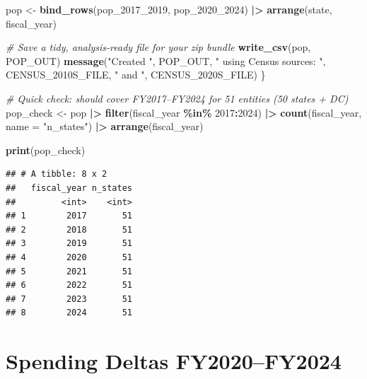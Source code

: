 \documentclass[
  11pt,
]{article}
\newenvironment{Shaded}{\begin{snugshade}}{\end{snugshade}}
\newcommand{\AttributeTok}[1]{\textcolor[rgb]{0.13,0.29,0.53}{#1}}
\newcommand{\CommentTok}[1]{\textcolor[rgb]{0.56,0.35,0.01}{\textit{#1}}}
\newcommand{\DecValTok}[1]{\textcolor[rgb]{0.00,0.00,0.81}{#1}}
\newcommand{\FunctionTok}[1]{\textcolor[rgb]{0.13,0.29,0.53}{\textbf{#1}}}
\newcommand{\NormalTok}[1]{#1}
\newcommand{\OtherTok}[1]{\textcolor[rgb]{0.56,0.35,0.01}{#1}}
\newcommand{\SpecialCharTok}[1]{\textcolor[rgb]{0.81,0.36,0.00}{\textbf{#1}}}
\newcommand{\StringTok}[1]{\textcolor[rgb]{0.31,0.60,0.02}{#1}}
\begin{document}
\begin{Shaded}
\begin{Highlighting}[]
\NormalTok{  pop }\OtherTok{\textless{}{-}} \FunctionTok{bind\_rows}\NormalTok{(pop\_2017\_2019, pop\_2020\_2024) }\SpecialCharTok{|\textgreater{}}
    \FunctionTok{arrange}\NormalTok{(state, fiscal\_year)}

  \CommentTok{\# Save a tidy, analysis{-}ready file for your zip bundle}
  \FunctionTok{write\_csv}\NormalTok{(pop, POP\_OUT)}
  \FunctionTok{message}\NormalTok{(}\StringTok{"Created "}\NormalTok{, POP\_OUT, }\StringTok{" using Census sources: "}\NormalTok{, CENSUS\_2010S\_FILE, }\StringTok{" and "}\NormalTok{, CENSUS\_2020S\_FILE)}
\NormalTok{\}}

\CommentTok{\# Quick check: should cover FY2017–FY2024 for 51 entities (50 states + DC)}
\NormalTok{pop\_check }\OtherTok{\textless{}{-}}\NormalTok{ pop }\SpecialCharTok{|\textgreater{}}
  \FunctionTok{filter}\NormalTok{(fiscal\_year }\SpecialCharTok{\%in\%} \DecValTok{2017}\SpecialCharTok{:}\DecValTok{2024}\NormalTok{) }\SpecialCharTok{|\textgreater{}}
  \FunctionTok{count}\NormalTok{(fiscal\_year, }\AttributeTok{name =} \StringTok{"n\_states"}\NormalTok{) }\SpecialCharTok{|\textgreater{}}
  \FunctionTok{arrange}\NormalTok{(fiscal\_year)}

\FunctionTok{print}\NormalTok{(pop\_check)}
\end{Highlighting}
\end{Shaded}

\begin{verbatim}
## # A tibble: 8 x 2
##   fiscal_year n_states
##         <int>    <int>
## 1        2017       51
## 2        2018       51
## 3        2019       51
## 4        2020       51
## 5        2021       51
## 6        2022       51
## 7        2023       51
## 8        2024       51
\end{verbatim}

\section{Spending Deltas
FY2020--FY2024}\label{spending-deltas-fy2020fy2024}
\end{document}
